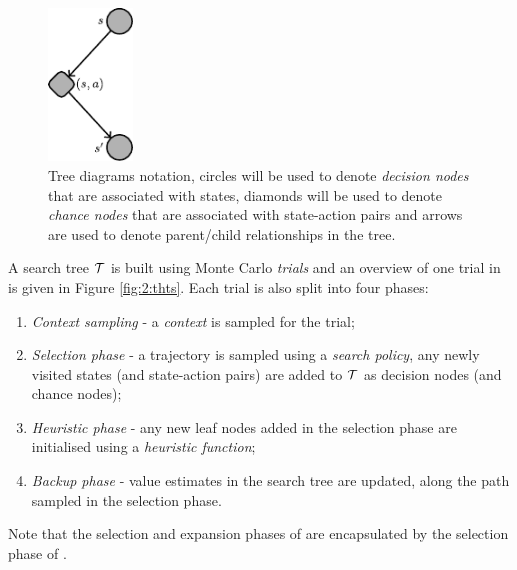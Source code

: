        \begin{figure}
            \centering\includegraphics[width=0.2\textwidth]{figures/ch2/tree_notation.pdf} 
            \caption[Tree diagrams notation.]{Tree diagrams notation, circles will be used to denote \textit{decision nodes} that are associated with states, diamonds will be used to denote \textit{chance nodes} that are associated with state-action pairs and arrows are used to denote parent/child relationships in the tree.}
            \label{fig:2:tree_notation}
        \end{figure}

        A search tree $\mathcal{T}$ is built using Monte Carlo \textit{trials} and an overview of one trial in \thtspp\ewe is given in Figure \ref{fig:2:thts}. Each \thtspp\ewe trial is also split into four phases: 
        \begin{enumerate}
            \item  
                \textit{Context sampling} - a \textit{context} is sampled for the trial;
            \item 
                \textit{Selection phase} - a trajectory is sampled using a \textit{search policy}, any newly visited states (and state-action pairs) are added to $\mathcal{T}$ as decision nodes (and chance nodes);
            \item 
                \textit{Heuristic phase} - any new leaf nodes added in the selection phase are initialised using a \textit{heuristic function}; 
            \item 
                \textit{Backup phase} - value estimates in the search tree are updated, along the path sampled in the selection phase. 
        \end{enumerate}

        Note that the selection and expansion phases of \mctsone\ewe are encapsulated by the selection phase of \thtspp.

